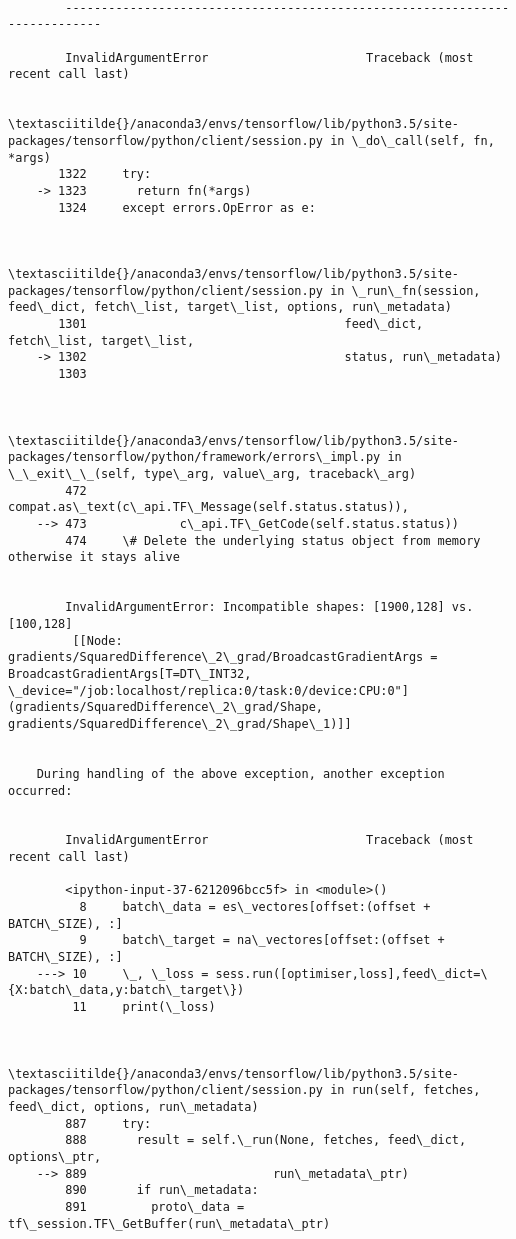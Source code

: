 \documentclass[11pt]{article}
\begin{document}
    \begin{Verbatim}[commandchars=\\\{\}]

        ---------------------------------------------------------------------------

        InvalidArgumentError                      Traceback (most recent call last)

        \textasciitilde{}/anaconda3/envs/tensorflow/lib/python3.5/site-packages/tensorflow/python/client/session.py in \_do\_call(self, fn, *args)
       1322     try:
    -> 1323       return fn(*args)
       1324     except errors.OpError as e:


        \textasciitilde{}/anaconda3/envs/tensorflow/lib/python3.5/site-packages/tensorflow/python/client/session.py in \_run\_fn(session, feed\_dict, fetch\_list, target\_list, options, run\_metadata)
       1301                                    feed\_dict, fetch\_list, target\_list,
    -> 1302                                    status, run\_metadata)
       1303 


        \textasciitilde{}/anaconda3/envs/tensorflow/lib/python3.5/site-packages/tensorflow/python/framework/errors\_impl.py in \_\_exit\_\_(self, type\_arg, value\_arg, traceback\_arg)
        472             compat.as\_text(c\_api.TF\_Message(self.status.status)),
    --> 473             c\_api.TF\_GetCode(self.status.status))
        474     \# Delete the underlying status object from memory otherwise it stays alive


        InvalidArgumentError: Incompatible shapes: [1900,128] vs. [100,128]
    	 [[Node: gradients/SquaredDifference\_2\_grad/BroadcastGradientArgs = BroadcastGradientArgs[T=DT\_INT32, \_device="/job:localhost/replica:0/task:0/device:CPU:0"](gradients/SquaredDifference\_2\_grad/Shape, gradients/SquaredDifference\_2\_grad/Shape\_1)]]

        
    During handling of the above exception, another exception occurred:


        InvalidArgumentError                      Traceback (most recent call last)

        <ipython-input-37-6212096bcc5f> in <module>()
          8     batch\_data = es\_vectores[offset:(offset + BATCH\_SIZE), :]
          9     batch\_target = na\_vectores[offset:(offset + BATCH\_SIZE), :]
    ---> 10     \_, \_loss = sess.run([optimiser,loss],feed\_dict=\{X:batch\_data,y:batch\_target\})
         11     print(\_loss)


        \textasciitilde{}/anaconda3/envs/tensorflow/lib/python3.5/site-packages/tensorflow/python/client/session.py in run(self, fetches, feed\_dict, options, run\_metadata)
        887     try:
        888       result = self.\_run(None, fetches, feed\_dict, options\_ptr,
    --> 889                          run\_metadata\_ptr)
        890       if run\_metadata:
        891         proto\_data = tf\_session.TF\_GetBuffer(run\_metadata\_ptr)



\end{Verbatim}
\end{document}
